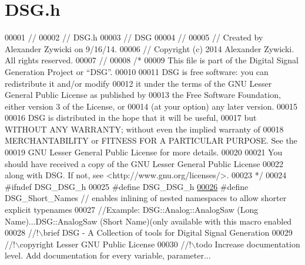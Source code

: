 \hypertarget{_d_s_g_8h_source}{\section{D\+S\+G.\+h}
\label{_d_s_g_8h_source}
}

\begin{DoxyCode}
00001 \textcolor{comment}{//}
00002 \textcolor{comment}{//  DSG.h}
00003 \textcolor{comment}{//  DSG}
00004 \textcolor{comment}{//}
00005 \textcolor{comment}{//  Created by Alexander Zywicki on 9/16/14.}
00006 \textcolor{comment}{//  Copyright (c) 2014 Alexander Zywicki. All rights reserved.}
00007 \textcolor{comment}{//}
00008 \textcolor{comment}{/*}
00009 \textcolor{comment}{ This file is part of the Digital Signal Generation Project or “DSG”.}
00010 \textcolor{comment}{}
00011 \textcolor{comment}{ DSG is free software: you can redistribute it and/or modify}
00012 \textcolor{comment}{ it under the terms of the GNU Lesser General Public License as published by}
00013 \textcolor{comment}{ the Free Software Foundation, either version 3 of the License, or}
00014 \textcolor{comment}{ (at your option) any later version.}
00015 \textcolor{comment}{}
00016 \textcolor{comment}{ DSG is distributed in the hope that it will be useful,}
00017 \textcolor{comment}{ but WITHOUT ANY WARRANTY; without even the implied warranty of}
00018 \textcolor{comment}{ MERCHANTABILITY or FITNESS FOR A PARTICULAR PURPOSE.  See the}
00019 \textcolor{comment}{ GNU Lesser General Public License for more details.}
00020 \textcolor{comment}{}
00021 \textcolor{comment}{ You should have received a copy of the GNU Lesser General Public License}
00022 \textcolor{comment}{ along with DSG.  If not, see <http://www.gnu.org/licenses/>.}
00023 \textcolor{comment}{ */}
00024 \textcolor{preprocessor}{#ifndef DSG\_DSG\_h}
00025 \textcolor{preprocessor}{#define DSG\_DSG\_h}
\hypertarget{_d_s_g_8h_source_l00026}{}\hyperlink{_d_s_g_8h_a83f0da18914977ca7a09b93cb1f57a05}{00026} \textcolor{preprocessor}{#define DSG\_Short\_Names // enables inlining of nested namespaces to allow shorter explicit typenames}
00027 \textcolor{comment}{//Example: DSG::Analog::AnalogSaw (Long Name)...DSG::AnalogSaw (Short Name)(only available with this macro
       enabled}\textcolor{comment}{}
00028 \textcolor{comment}{//!\(\backslash\)brief DSG - A Collection of tools for Digital Signal Generation}
00029 \textcolor{comment}{//!\(\backslash\)copyright Lesser GNU Public License}
00030 \textcolor{comment}{//!\(\backslash\)todo Increase documentation level. Add documentation for every variable, parameter...}

\end{DoxyCode}
